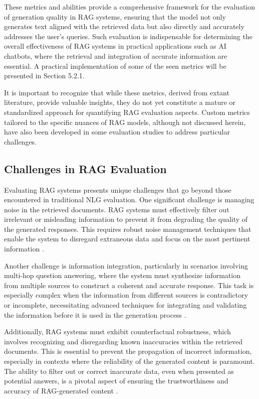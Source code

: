 These metrics and abilities provide a comprehensive framework for the evaluation of generation quality in RAG systems, ensuring that the model not only generates text aligned with the retrieved data but also directly and accurately addresses the user’s queries. Such evaluation is indispensable for determining the overall effectiveness of RAG systems in practical applications such as AI chatbots, where the retrieval and integration of accurate information are essential. A practical implementation of some of the seen metrics will be presented in Section 5.2.1.

It is important to recognize that while these metrics, derived from extant literature, provide valuable insights, they do not yet constitute a mature or standardized approach for quantifying RAG evaluation aspects. Custom metrics tailored to the specific nuances of RAG models, although not discussed herein, have also been developed in some evaluation studies to address particular challenges.

\subsection{Challenges in RAG Evaluation}

Evaluating RAG systems presents unique challenges that go beyond those encountered in traditional NLG evaluation. One significant challenge is managing noise in the retrieved documents. RAG systems must effectively filter out irrelevant or misleading information to prevent it from degrading the quality of the generated responses. This requires robust noise management techniques that enable the system to disregard extraneous data and focus on the most pertinent information \cite{gao2023retrieval}.

Another challenge is information integration, particularly in scenarios involving multi-hop question answering, where the system must synthesize information from multiple sources to construct a coherent and accurate response. This task is especially complex when the information from different sources is contradictory or incomplete, necessitating advanced techniques for integrating and validating the information before it is used in the generation process \cite{luo2023divide}.

Additionally, RAG systems must exhibit counterfactual robustness, which involves recognizing and disregarding known inaccuracies within the retrieved documents. This is essential to prevent the propagation of incorrect information, especially in contexts where the reliability of the generated content is paramount. The ability to filter out or correct inaccurate data, even when presented as potential answers, is a pivotal aspect of ensuring the trustworthiness and accuracy of RAG-generated content \cite{lewis2020retrieval}.

